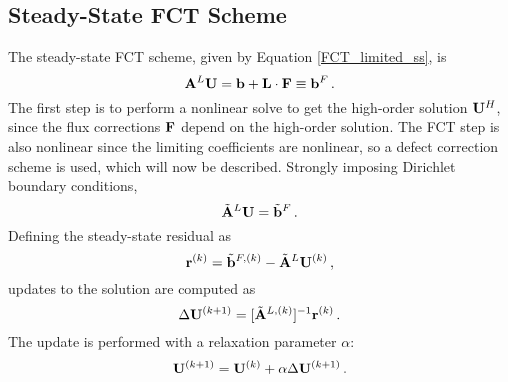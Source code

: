 \subsection{Steady-State FCT Scheme}
The steady-state FCT scheme, given by Equation \eqref{FCT_limited_ss}, is
\begin{equation}
   \mathbf{A}^L\mathbf{U} = \mathbf{b} + \mathbf{L}\cdot\mathbf{F} \equiv \mathbf{b}^F \,.
\end{equation}
The first step is to perform a nonlinear solve to get the high-order
solution $\mathbf{U}^H$, since the flux corrections $\mathbf{F}$ depend on the high-order
solution. The FCT step is also nonlinear since the limiting coefficients
are nonlinear, so a defect correction scheme is used, which will
now be described.
Strongly imposing Dirichlet boundary conditions,
\begin{equation}
   \tilde{\mathbf{A}}^L\mathbf{U} = \tilde{\mathbf{b}}^F \,.
\end{equation}
Defining the steady-state residual as
\begin{equation}
   \mathbf{r}^{(k)} = \tilde{\mathbf{b}}^{F,(k)} - \tilde{\mathbf{A}}^{L}\mathbf{U}^{(k)} \,,
\end{equation}
updates to the solution are computed as
\begin{equation}
   \Delta\mathbf{U}^{(k+1)} = [\tilde{\mathbf{A}}^{L,(k)}]^{-1}\mathbf{r}^{(k)} \,.
\end{equation}
The update is performed with a relaxation parameter $\alpha$:
\begin{equation}
   \mathbf{U}^{(k+1)} = \mathbf{U}^{(k)} + \alpha\Delta\mathbf{U}^{(k+1)} \,.
\end{equation}


